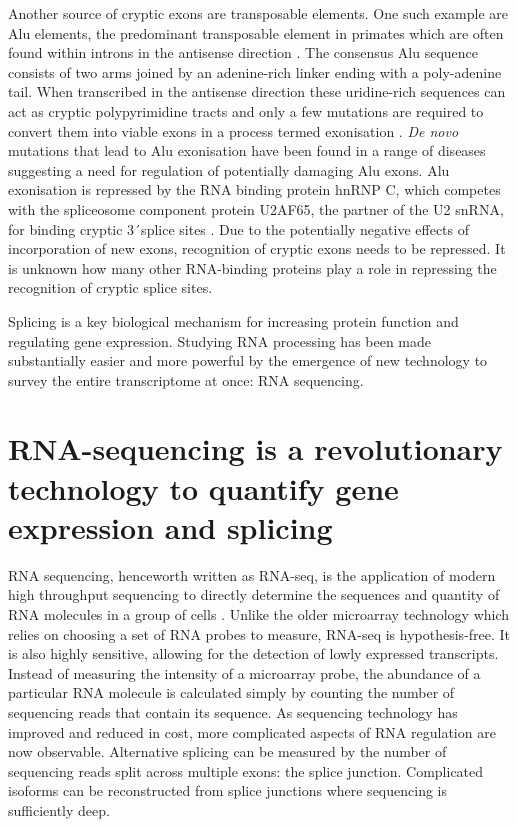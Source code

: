 Another source of cryptic exons are transposable elements. 
One such example are Alu elements, the predominant transposable element in primates which are often found within introns in the antisense direction \citep{Deininger2011-hc}. 
The consensus Alu sequence consists of two arms joined by an adenine-rich linker ending with a poly-adenine tail.  
When transcribed in the antisense direction these uridine-rich sequences can act as cryptic polypyrimidine tracts and only a few mutations are required to convert them into viable exons in a process termed exonisation \citep{Sorek2002-cm}.
\textit{De novo} mutations that lead to Alu exonisation have been found in a range of diseases \citep{Vorechovsky2010-or} suggesting a need for regulation of potentially damaging Alu exons. 
Alu exonisation is repressed by the RNA binding protein hnRNP C, which competes with the spliceosome component protein U2AF65, the partner of the U2 snRNA, for binding cryptic 3\'\ splice sites \citep{Zarnack2013}. 
Due to the potentially negative effects of incorporation of new exons, recognition of cryptic exons needs to be repressed. 
It is unknown how many other RNA-binding proteins play a role in repressing the recognition of cryptic splice sites.

Splicing is a key biological mechanism for increasing protein function and regulating gene expression.
Studying RNA processing has been made substantially easier and more powerful by the emergence of new technology to survey the entire transcriptome at once: RNA sequencing.



\section{RNA-sequencing is a revolutionary technology to quantify gene expression and splicing} %

RNA sequencing, henceworth written as RNA-seq, is the application of modern high throughput sequencing to directly determine the sequences and quantity of RNA molecules in a group of cells \citep{Wang2009}. 
Unlike the older microarray technology which relies on choosing a set of RNA probes to measure, RNA-seq is hypothesis-free. 
It is also highly sensitive, allowing for the detection of lowly expressed transcripts. 
Instead of measuring the intensity of a microarray probe, the abundance of a particular RNA molecule is calculated simply by counting the number of sequencing reads that contain its sequence. 
As sequencing technology has improved and reduced in cost, more complicated aspects of RNA regulation are now observable. 
Alternative splicing can be measured by the number of sequencing reads split across multiple exons: the splice junction. 
Complicated isoforms can be reconstructed from splice junctions where sequencing is sufficiently deep.

